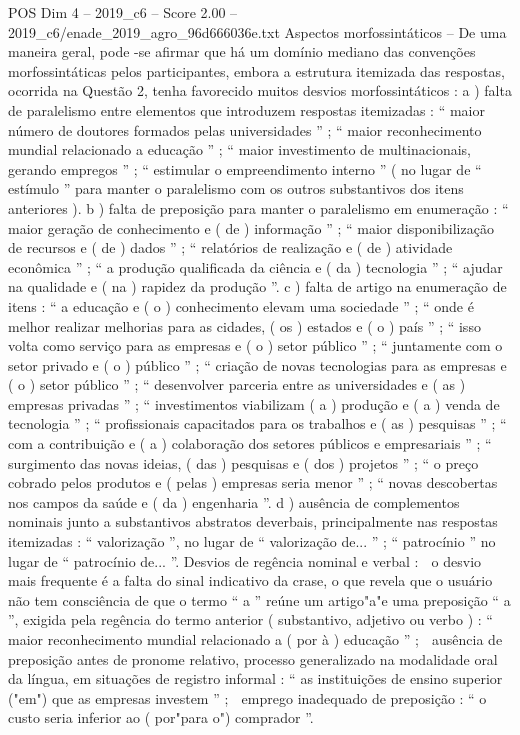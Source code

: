 \begin{textsample}{POS Dim 4 – 2019\_c6 – Score 2.00 – 2019\_c6/enade\_2019\_agro\_96d666036e.txt}
Aspectos morfossintáticos – De uma maneira geral, pode -se afirmar que há um domínio mediano das convenções morfossintáticas pelos participantes, embora a estrutura itemizada das respostas, ocorrida na Questão 2, tenha favorecido muitos desvios morfossintáticos : a ) falta de paralelismo entre elementos que introduzem respostas itemizadas : “ maior número de doutores formados pelas universidades ” ; “ maior reconhecimento mundial relacionado a educação ” ; “ maior investimento de multinacionais, gerando empregos ” ; “ estimular o empreendimento interno ” ( no lugar de “ estímulo ” para manter o paralelismo com os outros substantivos dos itens anteriores ). b ) falta de preposição para manter o paralelismo em enumeração : “ maior geração de conhecimento e ( de ) informação ” ; “ maior disponibilização de recursos e ( de ) dados ” ; “ relatórios de realização e ( de ) atividade econômica ” ; “ a produção qualificada da ciência e ( da ) tecnologia ” ; “ ajudar na qualidade e ( na ) rapidez da produção ”. c ) falta de artigo na enumeração de itens : “ a educação e ( o ) conhecimento elevam uma sociedade ” ; “ onde é melhor realizar melhorias para as cidades, ( os ) estados e ( o ) país ” ; “ isso volta como serviço para as empresas e ( o ) setor público ” ; “ juntamente com o setor privado e ( o ) público ” ; “ criação de novas tecnologias para as empresas e ( o ) setor público ” ; “ desenvolver parceria entre as universidades e ( as ) empresas privadas ” ; “ investimentos viabilizam ( a ) produção e ( a ) venda de tecnologia ” ; “ profissionais capacitados para os trabalhos e ( as ) pesquisas ” ; “ com a contribuição e ( a ) colaboração dos setores públicos e empresariais ” ; “ surgimento das novas ideias, ( das ) pesquisas e ( dos ) projetos ” ; “ o preço cobrado pelos produtos e ( pelas ) empresas seria menor ” ; “ novas descobertas nos campos da saúde e ( da ) engenharia ”. d ) ausência de complementos nominais junto a substantivos abstratos deverbais, principalmente nas respostas itemizadas : “ valorização ”, no lugar de “ valorização de... ” ; “ patrocínio ” no lugar de “ patrocínio de... ”.
Desvios de regência nominal e verbal :  o desvio mais frequente é a falta do sinal indicativo da crase, o que revela que o usuário não tem consciência de que o termo “ a ” reúne um artigo"a"e uma preposição “ a ”, exigida pela regência do termo anterior ( substantivo, adjetivo ou verbo ) : “ maior reconhecimento mundial relacionado a ( por à ) educação ” ;  ausência de preposição antes de pronome relativo, processo generalizado na modalidade oral da língua, em situações de registro informal : “ as instituições de ensino superior ("em") que as empresas investem ” ;  emprego inadequado de preposição : “ o custo seria inferior ao ( por"para o") comprador ”.

\end{textsample}
